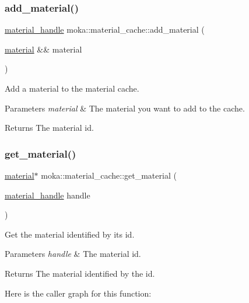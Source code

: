 \subsubsection{\texorpdfstring{add\_material()}{add\_material()}}
{\footnotesize\ttfamily \mbox{\hyperlink{structmoka_1_1material__handle}{material\+\_\+handle}} moka\+::material\+\_\+cache\+::add\+\_\+material (\begin{DoxyParamCaption}\item[{\mbox{\hyperlink{classmoka_1_1material}{material}} \&\&}]{material }\end{DoxyParamCaption})}



Add a material to the material cache. 


\begin{DoxyParams}{Parameters}
{\em material} & The material you want to add to the cache. \\
\hline
\end{DoxyParams}
\begin{DoxyReturn}{Returns}
The material id. 
\end{DoxyReturn}
\mbox{\label{classmoka_1_1material__cache_a061b66b048cb75daf59cf0238119c6e9}} 
\subsubsection{\texorpdfstring{get\_material()}{get\_material()}\hspace{0.1cm}{\footnotesize\ttfamily [1/2]}}
{\footnotesize\ttfamily \mbox{\hyperlink{classmoka_1_1material}{material}}$\ast$ moka\+::material\+\_\+cache\+::get\+\_\+material (\begin{DoxyParamCaption}\item[{\mbox{\hyperlink{structmoka_1_1material__handle}{material\+\_\+handle}}}]{handle }\end{DoxyParamCaption})}



Get the material identified by its id. 


\begin{DoxyParams}{Parameters}
{\em handle} & The material id. \\
\hline
\end{DoxyParams}
\begin{DoxyReturn}{Returns}
The material identified by the id. 
\end{DoxyReturn}
Here is the caller graph for this function\+:
\mbox{\label{classmoka_1_1material__cache_a7d913ebcd23f10e53620790e383f60c2}} 
